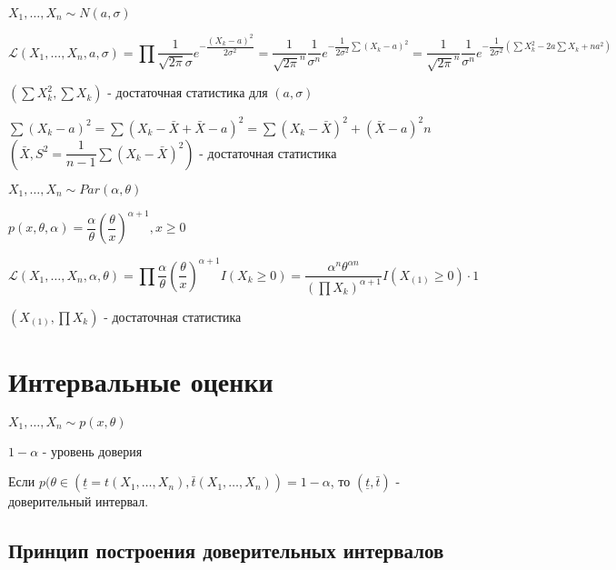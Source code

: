 \begin{ex}
  $X_1, \dots, X_n \sim N(a, \sigma)$

  \[
    \mathcal{L} (X_1, \dots, X_n, a, \sigma) = \prod \dfrac{1}{\sqrt{2\pi} \sigma} e^{-\dfrac{(X_k-a)^2}{2\sigma^2}} = \dfrac{1}{\sqrt{2\pi}^n} \dfrac{1}{\sigma^n} e^{-\dfrac{1}{2\sigma^2} \sum (X_k-a)^2} = \dfrac{1}{\sqrt{2\pi}^n} \dfrac{1}{\sigma^n} e^{-\dfrac{1}{2\sigma^2} (\sum X_k^2 - 2a \sum X_k + na^2)}
  \]

  $(\sum X_k^2, \sum X_k)$ - достаточная статистика для $(a, \sigma)$

  $\sum (X_k-a)^2 = \sum (X_k - \bar X + \bar X - a)^2 = \sum (X_k-\bar X)^2 + (\bar X - a)^2 n$
  $(\bar X, S^2 = \dfrac{1}{n-1} \sum (X_k-\bar X)^2)$ - достаточная статистика
\end{ex}

\begin{ex}
  $X_1, \dots, X_n \sim Par(\alpha, \theta)$

  $p(x, \theta, \alpha) = \dfrac{\alpha}{\theta} (\dfrac{\theta}{x})^{\alpha+1}, x\geqslant 0$

  \[
    \mathcal{L} (X_1, \dots, X_n, \alpha, \theta) = \prod \dfrac{\alpha}{\theta} (\dfrac{\theta}{x})^{\alpha+1} I(X_k \geqslant 0) = \dfrac{\alpha^n \theta^{\alpha n}}{(\prod X_k)^{\alpha+1}} I(X_{(1)}\geqslant 0) \cdot 1
  \]

  $(X_{(1)}, \prod X_k)$ - достаточная статистика
\end{ex}

\section{Интервальные оценки}

$X_1, \dots, X_n \sim p(x, \theta)$

$1-\alpha$ - уровень доверия

\begin{definition}
  Если $p(\theta \in (\underline{t} = t(X_1, \dots, X_n), \bar t(X_1, \dots, X_n)) = 1-\alpha$, то $(\underline{t}, \bar t)$ - доверительный интервал.
\end{definition}

\subsection{Принцип построения доверительных интервалов}

